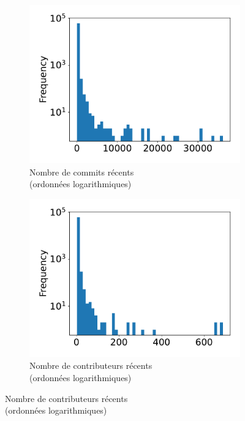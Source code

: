 \begin{figure}[ht]
    \begin{subfigure}[t]{0.3\textwidth}
        \includegraphics[width=\textwidth]{experiment/data_analysis/recentCommitCount_distribution}
        \caption{Nombre de \glspl{commit} récents\\(ordonnées logarithmiques)}
    \end{subfigure}
    \begin{subfigure}[t]{0.3\textwidth}
        \includegraphics[width=\textwidth]{experiment/data_analysis/recentContributorCount_distribution}
        \caption{Nombre de contributeurs récents\\(ordonnées logarithmiques)}
    \end{subfigure}%

\end{figure}
